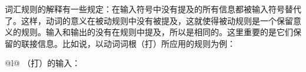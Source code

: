 \noindent
词汇规则的解释有一些规定：在输入符号中没有提及的所有信息都被输入符号替代了。这样，动词的意义在被动规则中没有被提及，这就使得被动规则是一个保留意义的规则。输入和输出的\contvsc 没有在规则中提及，所以是相同的。这里重要的是它们保留的联接信息。比如说，以动词词根（打）所应用的规则为例：
\eal
\label{lr-passiv-beispiel}
\ex 
\begin{tabular}[t]{@{}l@{}}
（打）的输入：\\
\end{tabular}
\ex 
